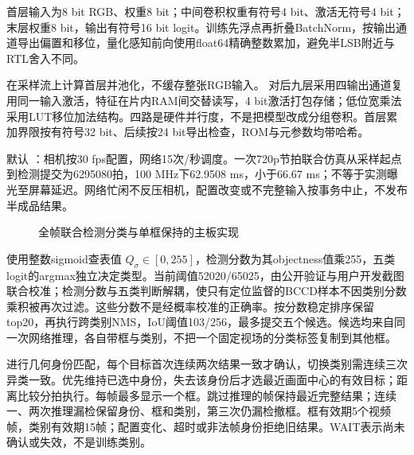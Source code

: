 首层输入为8 bit RGB、权重8 bit；中间卷积权重有符号4 bit、激活无符号4 bit；末层权重8 bit，输出有符号16 bit logit。训练先浮点再折叠BatchNorm，按输出通道导出偏置和移位，量化感知前向使用float64精确整数累加，避免半LSB附近与RTL舍入不同。

 在采样流上计算首层并池化，不缓存整张RGB输入。 对后九层采用四输出通道复用同一输入激活，特征在片内RAM间交替读写，4 bit激活打包存储；低位宽乘法采用LUT移位加法结构。四路是硬件并行度，不是把模型改成分组卷积。首层累加界限按有符号32 bit、后续按24 bit导出检查，ROM与元参数均带哈希。

默认 ：相机按30 fps配置，网络15次/秒调度。一次720p节拍联合仿真从采样起点到检测提交为6295080拍，100 MHz下62.9508 ms，小于66.67 ms；不等于实测曝光至屏幕延迟。网络忙闲不反压相机，配置改变或不完整输入按事务中止，不发布半成品结果。\cite{yoloreport}

\begin{figure}[htbp]\centering
{}
\caption{全帧联合检测分类与单框保持的主板实现}\label{fig:yolo}
\end{figure}

 使用整数sigmoid查表值 $Q_{\sigma}\in[0,255]$，检测分数为其objectness值乘255，五类logit的argmax独立决定类型。当前阈值52020/65025，由公开验证与用户开发截图联合校准；检测分数与五类判断解耦，使只有定位监督的BCCD样本不因类别分数乘积被再次过滤。这些分数不是经概率校准的正确率。按分数稳定排序保留top20，再执行跨类别NMS，IoU阈值103/256，最多提交五个候选。候选均来自同一次网络推理，各自带框与类别，不把一个固定视场的分类标签复制到其他框。

 进行几何身份匹配，每个目标首次连续两次结果一致才确认，切换类别需连续三次异类一致。优先维持已选中身份，失去该身份后才选最近画面中心的有效目标；距离比较分拍执行。每帧最多显示一个框。跳过推理的帧保持最近完整结果；连续一、两次推理漏检保留身份、框和类别，第三次仍漏检撤框。框有效期5个视频帧，类别有效期15帧；配置变化、超时或非法帧身份拒绝旧结果。WAIT表示尚未确认或失效，不是训练类别。

